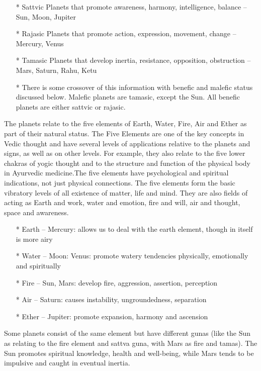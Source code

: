 \begin{enumerate}
\item[*] Sattvic Planets that promote awareness, harmony, intelligence, balance – Sun, Moon, Jupiter
\item[*] Rajasic Planets that promote action, expression, movement, change  – Mercury, Venus
\item[*] Tamasic Planets that develop inertia, resistance, opposition, obstruction – Mars, Saturn, Rahu, Ketu
\item[*] There is some crossover of this information with  benefic and malefic status discussed below. Malefic planets are tamasic, except the Sun. All benefic planets are either sattvic or rajasic.
\end{enumerate}
 


 

The planets relate to the five elements of Earth, Water, Fire, Air and Ether as part of their natural status. The Five Elements are one of the key concepts in Vedic thought and have several levels of applications relative to the planets and signs, as well as on other levels. For example, they also relate to the five lower chakras of yogic thought and to the structure and function of the physical body in Ayurvedic medicine.The five elements have psychological and spiritual indications, not just physical connections. The five elements form the basic vibratory levels of all existence of matter, life and mind. They are also fields of acting as Earth and work, water and emotion, fire and will, air and thought, space and awareness.

 

\begin{enumerate}
\item[*] Earth – Mercury: allows us to deal with the earth element, though in itself is more airy
\item[*] Water – Moon: Venus: promote watery tendencies physically, emotionally and spiritually
\item[*] Fire – Sun, Mars: develop fire, aggression, assertion, perception
\item[*] Air – Saturn: causes instability, ungroundedness, separation
\item[*] Ether – Jupiter: promote expansion, harmony and ascension
 \end{enumerate}

Some planets consist of the same element but have different gunas (like the Sun as relating to the fire element and sattva guna, with Mars as fire and tamas). The Sun promotes spiritual knowledge, health and well-being, while Mars tends to be impulsive and caught in eventual inertia.

